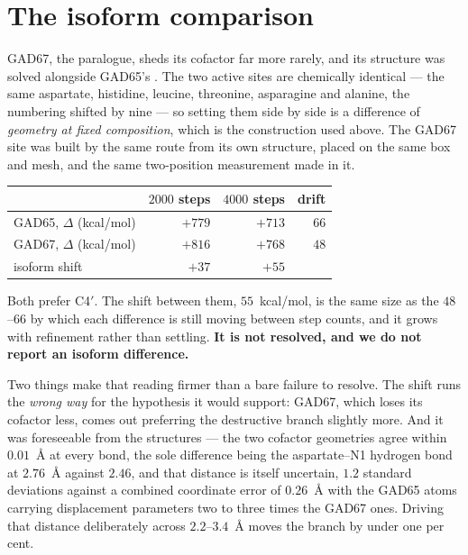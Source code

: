 \documentclass[11pt]{article}
\newcommand{\Cfp}{C4\ensuremath{'}}
\begin{document}
\section{The isoform comparison}

GAD67, the paralogue, sheds its cofactor far more rarely, and its structure was solved alongside
GAD65's \cite{fenalti}. The two active sites are chemically identical --- the same aspartate,
histidine, leucine, threonine, asparagine and alanine, the numbering shifted by nine --- so setting
them side by side is a difference of \emph{geometry at fixed composition}, which is the construction
used above. The GAD67 site was built by the same route from its own structure, placed on the same box
and mesh, and the same two-position measurement made in it.

\begin{center}
\small
\begin{tabular}{@{}lrrr@{}}
\toprule
 & $2000$ steps & $4000$ steps & drift\\
\midrule
GAD65, $\Delta$ (kcal/mol) & $+779$ & $+713$ & $66$\\
GAD67, $\Delta$ (kcal/mol) & $+816$ & $+768$ & $48$\\
\midrule
isoform shift & $+37$ & $+55$ & \\
\bottomrule
\end{tabular}
\end{center}

\noindent Both prefer \Cfp{}. The shift between them, $55$~kcal/mol, is the same size as the
$48$--$66$ by which each difference is still moving between step counts, and it grows with refinement
rather than settling. \textbf{It is not resolved, and we do not report an isoform difference.}

Two things make that reading firmer than a bare failure to resolve. The shift runs the \emph{wrong
way} for the hypothesis it would support: GAD67, which loses its cofactor less, comes out preferring
the destructive branch slightly more. And it was foreseeable from the structures --- the two cofactor
geometries agree within $0.01$~\AA{} at every bond, the sole difference being the aspartate--N1
hydrogen bond at $2.76$~\AA{} against $2.46$, and that distance is itself uncertain, $1.2$ standard
deviations against a combined coordinate error of $0.26$~\AA{} with the GAD65 atoms carrying
displacement parameters two to three times the GAD67 ones. Driving that distance deliberately across
$2.2$--$3.4$~\AA{} moves the branch by under one per cent.
\end{document}
